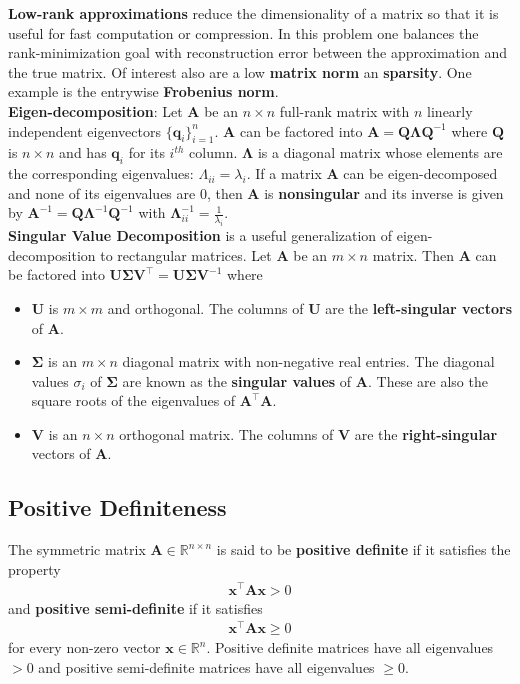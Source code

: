\documentclass{harvardml}
\theoremstyle{definition}
\theoremstyle{plain}
\newcommand{\R}{\mathbb{R}}
\renewcommand{\v}[1]{\mathbf{#1}}
\begin{document}
    	\noindent \textbf{Low-rank approximations} reduce the
		dimensionality of a matrix so that it is useful for fast 
		computation or compression. In this problem one balances 
		the rank-minimization goal with reconstruction error between 
		the approximation and the true matrix. Of interest also are a low 
        \textbf{matrix norm} an \textbf{sparsity}. One example is the entrywise 
		\textbf{Frobenius norm}.\\

		\noindent \textbf{Eigen-decomposition}:
		Let $\v A$ be an $n \times n$ full-rank
		matrix with $n$ linearly independent eigenvectors
		$\{\v q_i\}_{i=1}^n$. $\v A$ can be factored into
		$ \v A = \v Q \v \Lambda \v Q^{-1} $ where $\v Q$
		is $n \times n$ and has $\v q_i$ for its $i^{th}$
		column. $\v \Lambda$ is a diagonal matrix whose elements
		are the corresponding eigenvalues: $\Lambda_{ii} = \lambda_i$.
		If a matrix $\v A$ can be eigen-decomposed and none of its
		eigenvalues are $0$, then $\v A$ is \textbf{nonsingular} and
		its inverse is given by $\v A^{-1} = \v Q \v \Lambda^{-1}
		\v Q^{-1}$ with $\v \Lambda^{-1}_{ii} = \frac{1}{\lambda_i}$.\\

		\noindent \textbf{Singular Value Decomposition} is 
		a useful generalization of eigen-decomposition
		to rectangular matrices. Let $\v A$ be an $m \times n$ matrix. 
		Then $\v A$
		can be factored into $\v U \v \Sigma \v V^\top = 
		\v U \v \Sigma \v V^{-1}$ where
		\begin{itemize}
			\item $\v U$ is $m \times m$ and
		orthogonal. The columns of $\v U$ are
		the \textbf{left-singular vectors} of $\v A$.
			\item $\v \Sigma$ is an $m \times n$ diagonal
		matrix with non-negative real entries. The diagonal
		values $\sigma_i$ of $\v \Sigma$ are known as the
		\textbf{singular values} of $\v A$. These are also
		the square roots of the eigenvalues of $\v A^\top \v A$.
			\item $\v V$ is an $n
		\times n$ orthogonal matrix. The columns of $\v V$ are
		the \textbf{right-singular} vectors of $\v A$.
		\end{itemize}

    \subsection{Positive Definiteness}

        The symmetric matrix $\mathbf{A} \in \R^{n\times n}$ is 
        said to be \textbf{positive definite} if it satisfies the property 
        \begin{align*}
            \mathbf{x}^\top \mathbf{A} \mathbf{x} > 0
        \end{align*}
        and \textbf{positive semi-definite} if it satisfies
        \begin{align*}
            \mathbf{x}^\top \mathbf{A} \mathbf{x} \geq 0
        \end{align*}
        for every non-zero vector $\mathbf{x} \in \R^n$. 
        Positive definite matrices have all eigenvalues $>0$ 
        and positive semi-definite matrices have all eigenvalues $\geq0$.
    
\end{document}
